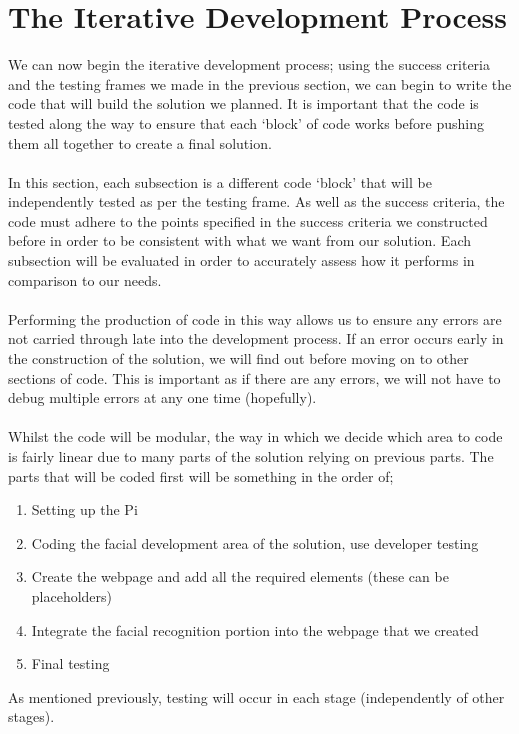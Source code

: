 \documentclass[9pt]{article}
\begin{document}
\section{The Iterative Development Process}
We can now begin the iterative development process; using the success criteria and the testing frames we made in the previous section, we can begin to write the code that will build the solution we planned. It is important that the code is tested along the way to ensure that each `block' of code works before pushing them all together to create a final solution.\\\\
In this section, each subsection is a different code `block' that will be independently tested as per the testing frame. As well as the success criteria, the code must adhere to the points specified in the success criteria we constructed before in order to be consistent with what we want from our solution. Each subsection will be evaluated in order to accurately assess how it performs in comparison to our needs.\\\\
Performing the production of code in this way allows us to ensure any errors are not carried through late into the development process. If an error occurs early in the construction of the solution, we will find out before moving on to other sections of code. This is important as if there are any errors, we will not have to debug multiple errors at any one time (hopefully).\\\\
Whilst the code will be modular, the way in which we decide which area to code is fairly linear due to many parts of the solution relying on previous parts. The parts that will be coded first will be something in the order of;
\begin{enumerate}
	\item Setting up the Pi
	\item Coding the facial development area of the solution, use developer testing
	\item Create the webpage and add all the required elements (these can be placeholders)
	\item Integrate the facial recognition portion into the webpage that we created
	\item Final testing
\end{enumerate}
As mentioned previously, testing will occur in each stage (independently of other stages).\\\\
\end{document}
